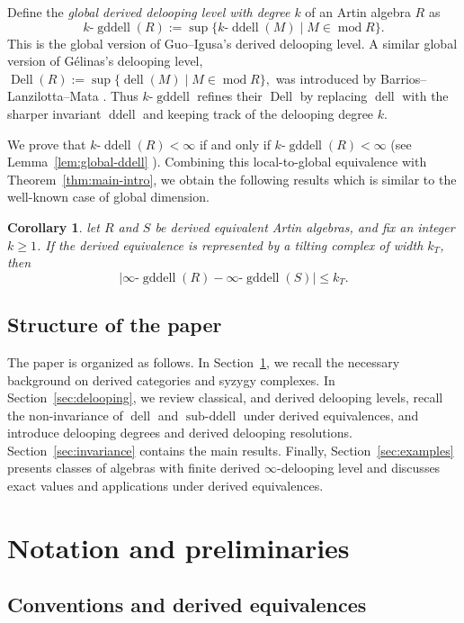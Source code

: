 \documentclass[12pt,a4paper,reqno]{amsart}
\theoremstyle{plain}
\newtheorem{corollary}[theorem]{Corollary}
\theoremstyle{definition}
\theoremstyle{remark}
\DeclareMathOperator{\modd}{mod}
\DeclareMathOperator{\dell}{dell}
\DeclareMathOperator{\subddell}{sub\text{-}ddell}
\DeclareMathOperator{\ddell}{ddell}
\DeclareMathOperator{\Dell}{Dell}
\DeclareMathOperator{\gddell}{gddell}
\begin{document}
Define the \emph{global derived delooping level with degree
$k$} of an Artin algebra $R$ as
\[
k\text{-}\gddell(R)
:=\sup\{k\text{-}\ddell(M)\mid M\in\modd R\}.
\]
This is the global version of Guo--Igusa's derived delooping level.
A similar global version of Gélinas's delooping level, $\Dell(R):=\sup\{\dell(M)\mid M\in\modd R\},$ 
was introduced by Barrios--Lanzilotta--Mata \cite{BLM}.  Thus
$k\text{-}\gddell$ refines their $\Dell$ by replacing $\dell$ with
the sharper invariant $\ddell$ and keeping track of the delooping
degree $k$.

We prove that $k\text{-}\ddell(R)<\infty$ if and only if  $k\text{-}\gddell(R)<\infty$ (see  Lemma~\ref{lem:global-ddell} ). Combining this local-to-global equivalence with
Theorem~\ref{thm:main-intro}, we obtain the following results which is similar to the well-known case of global dimension.

\begin{corollary}\label{cor:gddell-intro}
let $R$ and $S$ be derived equivalent Artin algebras, and fix an integer $k\ge 1$. If the derived equivalence is represented by a tilting complex of width $k_T$, then 
\[
\left|
\infty\text{-}\gddell(R)
-
\infty\text{-}\gddell(S)
\right|
\leq k_T.
\]
\end{corollary}


\subsection{Structure of the paper}

The paper is organized as follows. In Section~\ref{sec:prelim}, we recall the necessary background on derived categories and syzygy complexes. In Section~\ref{sec:delooping}, we review classical, and derived delooping levels, recall the non-invariance of $\dell$ and $\subddell$ under derived equivalences, and introduce delooping degrees and derived delooping resolutions. Section~\ref{sec:invariance} contains the main results. Finally, Section~\ref{sec:examples} presents classes of algebras with finite derived $\infty$-delooping level and discusses exact values and applications under derived equivalences.

\section{Notation and preliminaries}\label{sec:prelim}

\subsection{Conventions and derived equivalences}
\end{document}

